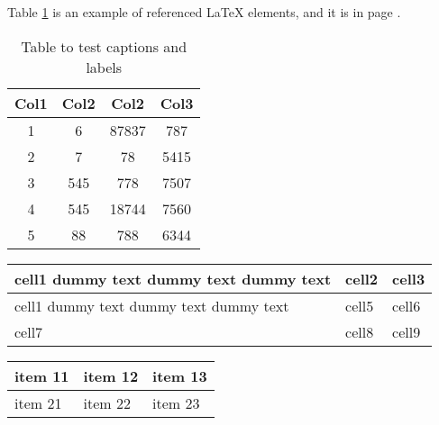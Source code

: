 \documentclass[12pt, letterpaper]{article}
\begin{document}
Table \ref{table:data} is an example of referenced \LaTeX{} elements, and it is in page \pageref{table:data}.

\begin{table}
\begin{center}
\begin{tabular}{||c c | c c||}
	\hline
	Col1 & Col2 & Col2 & Col3 \\ [0.5ex]
	\hline\hline
	1 & 6 & 87837 & 787 \\
	\hline
	2 & 7 & 78 & 5415 \\
	\hline
	3 & 545 & 778 & 7507 \\
	\hline
	4 & 545 & 18744 & 7560 \\
	\hline
	5 & 88 & 788 & 6344 \\ [1ex]
	\hline
\end{tabular}
\caption{Table to test captions and labels}	%
\label{table:data}	%
\end{center}
\end{table}

\begin{center}
	\begin{tabular}{ | m{5em} | m{1cm}| m{1cm} | } 
		\hline
		cell1 dummy text dummy text dummy text& cell2 & cell3 \\ 
		\hline
		cell1 dummy text dummy text dummy text & cell5 & cell6 \\ 
		\hline
		cell7 & cell8 & cell9 \\ 
		\hline
	\end{tabular}
\end{center}

\begin{tabu} to 0.8\textwidth { | X[l] | X[c] | X[r] | }
	\hline	
	item 11 & item 12 & item 13 \\
	\hline
	item 21  & item 22  & item 23  \\
\hline
\end{tabu}

\date{\today}
\end{document}
